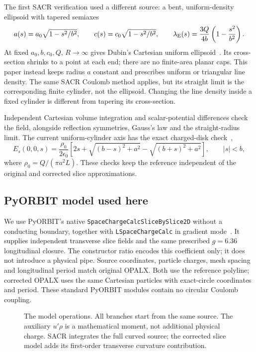 \documentclass[10pt,a4paper]{article}
\newcommand{\eps}{\epsilon_0}
\begin{document}
The first SACR verification used a different source: a bent,
uniform-density ellipsoid with tapered semiaxes
\begin{equation}
 a(s)=a_0\sqrt{1-s^2/b^2},\qquad
 c(s)=c_0\sqrt{1-s^2/b^2},\qquad
 \lambda_{\rm E}(s)=\frac{3Q}{4b}\left(1-\frac{s^2}{b^2}\right).
 \label{eq:sacr-ellipsoid}
\end{equation}
At fixed $a_0,b,c_0,Q$, $R\to\infty$ gives Dubin's Cartesian uniform
ellipsoid~\cite{dubin}. Its cross-section shrinks to a point at each end;
there are no finite-area planar caps. This paper instead keeps radius $a$
constant and prescribes uniform or triangular line density. The same SACR
Coulomb method applies, but its straight limit is the corresponding finite
cylinder, not the ellipsoid. Changing the line density inside a fixed
cylinder is different from tapering its cross-section.

\begin{samepage}
Independent Cartesian volume integration and scalar-potential differences
check the field, alongside reflection symmetries, Gauss's law and the
straight-radius limit. The current uniform-cylinder axis has the exact
charged-disk check~\cite{disk},
\begin{equation}
 E_s(0,0,s)=\frac{\rho_0}{2\eps}\left[
 2s+\sqrt{(b-s)^2+a^2}-\sqrt{(b+s)^2+a^2}\right],\qquad |s|<b,
 \label{eq:axis}
\end{equation}
where $\rho_0=Q/(\pi a^2L)$. These checks keep the reference independent of
the original and corrected slice approximations.
\end{samepage}

\subsection{PyORBIT model used here}
We use PyORBIT's native \texttt{SpaceChargeCalcSliceBySlice2D} without a
conducting boundary, together with \texttt{LSpaceChargeCalc} in gradient
mode~\cite{pyorbit,pyorbitcode}. It supplies independent transverse slice
fields and the same prescribed $g=6.36$ longitudinal closure. The constructor
ratio encodes this coefficient only; it does not introduce a physical pipe.
Source coordinates, particle charges, mesh spacing and longitudinal period
match original OPALX. Both use the reference polyline; corrected OPALX
uses the same Cartesian particles with exact-circle coordinates and period.
These standard PyORBIT modules contain no circular Coulomb coupling.

\begin{figure}[ht]
\centering

\caption{The model operations. All branches start from the same source.
The auxiliary $u'\rho$ is a mathematical moment, not additional physical
charge. SACR integrates the full curved source; the corrected slice model
adds its first-order transverse curvature contribution.}
\label{fig:models}
\end{figure}
\end{document}
